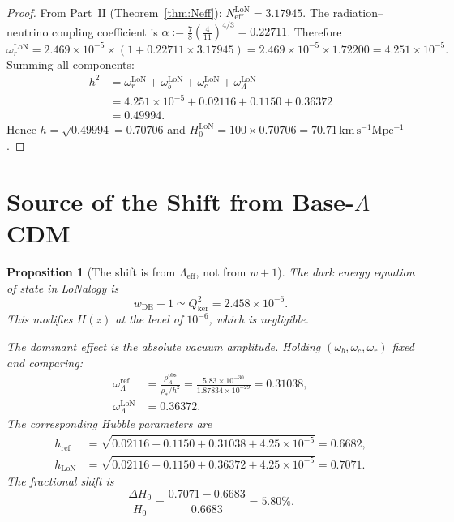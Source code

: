 \documentclass[12pt]{article}
\theoremstyle{plain}
\newtheorem{proposition}[theorem]{Proposition}
\theoremstyle{definition}
\numberwithin{equation}{section}
\newcommand{\kker}{\mathrm{ker}}
\newcommand{\eff}{\mathrm{eff}}
\newcommand{\obs}{\mathrm{obs}}
\newcommand{\LoN}{\mathrm{LoN}}
\begin{document}
\begin{proof}
From Part~II (Theorem~\ref{thm:Neff}): $N_{\eff}^{\LoN}=3.17945$.
The radiation--neutrino coupling coefficient is
$\alpha:=\frac{7}{8}\left(\frac{4}{11}\right)^{4/3}=0.22711$.
Therefore
\begin{equation}
\omega_r^{\LoN} = 2.469\times10^{-5}\times(1+0.22711\times3.17945)
= 2.469\times10^{-5}\times1.72200
= 4.251\times10^{-5}.
\end{equation}
Summing all components:
\begin{align}
h^2 &= \omega_r^{\LoN}+\omega_b^{\LoN}+\omega_c^{\LoN}+\omega_\Lambda^{\LoN}\\
&= 4.251\times10^{-5}+0.02116+0.1150+0.36372\\
&= 0.49994.
\end{align}
Hence $h=\sqrt{0.49994}=0.70706$ and
$H_0^{\LoN}=100\times0.70706=70.71\,\mathrm{km\,s^{-1}Mpc^{-1}}$.
\end{proof}


\section{Source of the Shift from Base-$\Lambda$CDM}\label{sec:shift}

\begin{proposition}[The shift is from $\Lambda_{\eff}$, not from $w+1$]\label{prop:shift}
The dark energy equation of state in LoNalogy is~\cite{ParticleCosmo}
\begin{equation}
w_{\mathrm{DE}}+1 \simeq Q_{\kker}^2 = 2.458\times10^{-6}.
\end{equation}
This modifies $H(z)$ at the level of $10^{-6}$, which is negligible.

The dominant effect is the absolute vacuum amplitude.  Holding
$(\omega_b,\omega_c,\omega_r)$ fixed and comparing:
\begin{align}
\omega_\Lambda^{\mathrm{ref}} &= \frac{\rho_\Lambda^{\obs}}{\rho_*/h^2}
= \frac{5.83\times10^{-30}}{1.87834\times10^{-29}} = 0.31038,\\
\omega_\Lambda^{\LoN} &= 0.36372.
\end{align}
The corresponding Hubble parameters are
\begin{align}
h_{\mathrm{ref}} &= \sqrt{0.02116+0.1150+0.31038+4.25\times10^{-5}} = 0.6682,\\
h_{\LoN} &= \sqrt{0.02116+0.1150+0.36372+4.25\times10^{-5}} = 0.7071.
\end{align}
The fractional shift is
\begin{equation}
\boxed{\frac{\Delta H_0}{H_0} = \frac{0.7071-0.6683}{0.6683} = 5.80\%.}
\end{equation}
\end{proposition}
\end{document}
